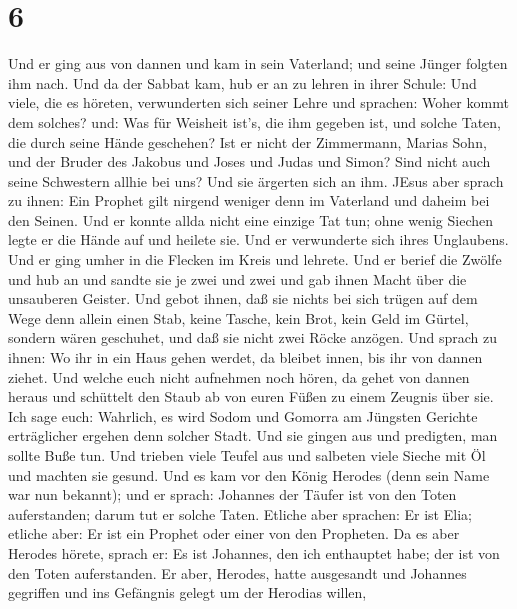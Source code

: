 \hypertarget{section-5}{%
\section{6}\label{section-5}}

 Und er ging aus von dannen und kam in sein Vaterland; und
seine Jünger folgten ihm nach.  Und da der Sabbat kam, hub
er an zu lehren in ihrer Schule: Und viele, die es höreten, verwunderten
sich seiner Lehre und sprachen: Woher kommt dem solches? und: Was für
Weisheit ist's, die ihm gegeben ist, und solche Taten, die durch seine
Hände geschehen?  Ist er nicht der Zimmermann, Marias Sohn,
und der Bruder des Jakobus und Joses und Judas und Simon? Sind nicht
auch seine Schwestern allhie bei uns? Und sie ärgerten sich an ihm.
 JEsus aber sprach zu ihnen: Ein Prophet gilt nirgend
weniger denn im Vaterland und daheim bei den Seinen.  Und er
konnte allda nicht eine einzige Tat tun; ohne wenig Siechen legte er die
Hände auf und heilete sie.  Und er verwunderte sich ihres
Unglaubens. Und er ging umher in die Flecken im Kreis und lehrete.
 Und er berief die Zwölfe und hub an und sandte sie je zwei
und zwei und gab ihnen Macht über die unsauberen Geister. 
Und gebot ihnen, daß sie nichts bei sich trügen auf dem Wege denn allein
einen Stab, keine Tasche, kein Brot, kein Geld im Gürtel, 
sondern wären geschuhet, und daß sie nicht zwei Röcke anzögen.
 Und sprach zu ihnen: Wo ihr in ein Haus gehen werdet, da
bleibet innen, bis ihr von dannen ziehet.  Und welche euch
nicht aufnehmen noch hören, da gehet von dannen heraus und schüttelt den
Staub ab von euren Füßen zu einem Zeugnis über sie. Ich sage euch:
Wahrlich, es wird Sodom und Gomorra am Jüngsten Gerichte erträglicher
ergehen denn solcher Stadt.  Und sie gingen aus und
predigten, man sollte Buße tun.  Und trieben viele Teufel
aus und salbeten viele Sieche mit Öl und machten sie gesund.
 Und es kam vor den König Herodes (denn sein Name war nun
bekannt); und er sprach: Johannes der Täufer ist von den Toten
auferstanden; darum tut er solche Taten.  Etliche aber
sprachen: Er ist Elia; etliche aber: Er ist ein Prophet oder einer von
den Propheten.  Da es aber Herodes hörete, sprach er: Es
ist Johannes, den ich enthauptet habe; der ist von den Toten
auferstanden.  Er aber, Herodes, hatte ausgesandt und
Johannes gegriffen und ins Gefängnis gelegt um der Herodias willen,
